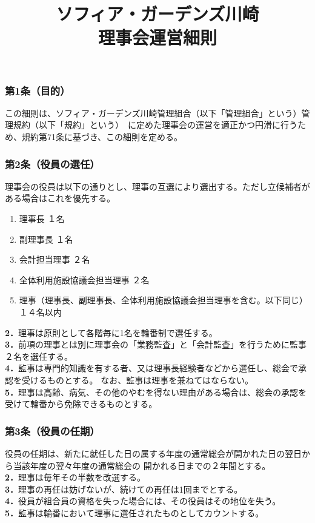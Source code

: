 \documentclass[12pt,uplatex]{jsarticle}
\title{ソフィア・ガーデンズ川崎 \\  理事会運営細則}
\begin{document}
\maketitle
\tableofcontents
\clearpage
\addtocounter{page}{-1}
\pagestyle{plain}

\subsubsection*{ 第1条（目的）}
この細則は、ソフィア・ガーデンズ川崎管理組合（以下「管理組合」という）管理規約（以下「規約」という）\
に定めた理事会の運営を適正かつ円滑に行うため、規約第71条に基づき、この細則を定める。

\subsubsection*{ 第2条（役員の選任）}
理事会の役員は以下の通りとし、理事の互選により選出する。ただし立候補者がある場合はこれを優先する。
\begin{enumerate}
\item 理事長				１名
\item 副理事長				１名
\item 会計担当理事				２名
\item 全体利用施設協議会担当理事		２名
\item 理事（理事長、副理事長、全体利用施設協議会担当理事を含む。以下同じ） １４名以内
\end{enumerate}
\textbf{2．}理事は原則として各階毎に1名を輪番制で選任する。\\
\textbf{3．}前項の理事とは別に理事会の「業務監査」と「会計監査」を行うために監事２名を選任する。\\
\textbf{4．}監事は専門的知識を有する者、又は理事長経験者などから選任し、総会で承認を受けるものとする。
なお、監事は理事を兼ねてはならない。\\
\textbf{5．}理事は高齢、病気、その他のやむを得ない理由がある場合は、総会の承認を受けて輪番から免除できるものとする。\\

\subsubsection*{ 第3条（役員の任期）}
役員の任期は、新たに就任した日の属する年度の通常総会が開かれた日の翌日から当該年度の翌々年度の通常総会の
開かれる日までの２年間とする。\\
\textbf{2．}理事は毎年その半数を改選する。\\
\textbf{3．}理事の再任は妨げないが、続けての再任は1回までとする。\\
\textbf{4．}役員が組合員の資格を失った場合には、その役員はその地位を失う。\\
\textbf{5．}監事は輪番において理事に選任されたものとしてカウントする。\\
\end{document}
